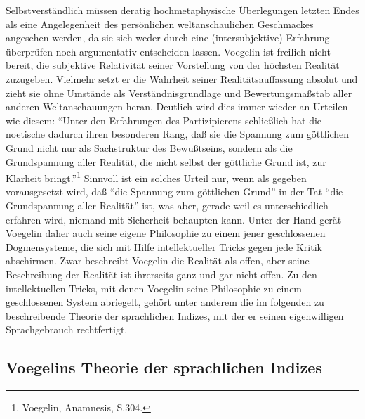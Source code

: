  
 Selbstverständlich müssen deratig hochmetaphysische Überlegungen
 letzten Endes als eine Angelegenheit des persönlichen weltanschaulichen
 Geschmackes angesehen werden, da sie sich weder durch eine
 (intersubjektive) Erfahrung überprüfen noch argumentativ entscheiden
 lassen. Voegelin ist freilich nicht bereit, die subjektive Relativität
 seiner Vorstellung von der höchsten Realität zuzugeben. Vielmehr setzt
 er die Wahrheit seiner Realitätsauf\/fassung absolut und zieht sie ohne
 Umstände als Verständnisgrundlage und Bewertungsmaßstab aller anderen
 Weltanschauungen heran. Deutlich wird dies immer wieder an Urteilen wie
 diesem: "`Unter den Erfahrungen des Partizipierens schließlich hat die
 noetische dadurch ihren besonderen Rang, daß sie die Spannung zum
 göttlichen Grund nicht nur als Sachstruktur des Bewußtseins, sondern
 als die Grundspannung aller Realität, die nicht selbst der göttliche
 Grund ist, zur Klarheit bringt."'\footnote{Voegelin, Anamnesis, S.304.}
 Sinnvoll ist ein solches Urteil nur, wenn als gegeben vorausgesetzt
 wird, daß "`die Spannung zum göttlichen Grund"' in der Tat "`die
 Grundspannung aller Realität"' ist, was aber, gerade weil es
 unterschiedlich erfahren wird, niemand mit Sicherheit behaupten kann.
 Unter der Hand gerät Voegelin daher auch seine eigene Philosophie zu
 einem jener geschlossenen Dogmensysteme, die sich mit Hilfe
 intellektueller Tricks gegen jede Kritik abschirmen. Zwar beschreibt
 Voegelin die Realität als offen, aber seine Beschreibung der Realität
 ist ihrerseits ganz und gar nicht offen. Zu den intellektuellen Tricks,
 mit denen Voegelin seine Philosophie zu einem geschlossenen System
 abriegelt, gehört unter anderem die im folgenden zu beschreibende
 Theorie der sprachlichen Indizes, mit der er seinen eigenwilligen
 Sprachgebrauch rechtfertigt.

\subsection{Voegelins Theorie der sprachlichen Indizes}

